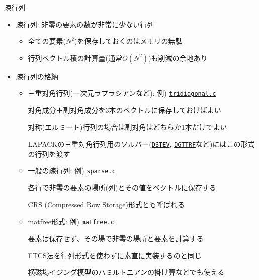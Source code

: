 \begin{frame}[t,fragile]{疎行列}
  \begin{itemize}
    \setlength{\itemsep}{1em}
  \item 疎行列: 非零の要素の数が非常に少ない行列
    \begin{itemize}
    \item 全ての要素($N^2$)を保存しておくのはメモリの無駄
    \item 行列ベクトル積の計算量(通常$O(N^2)$)も削減の余地あり
    \end{itemize}
  \item 疎行列の格納
    \begin{itemize}
    \item 三重対角行列(一次元ラプラシアンなど): 例) \href{https://github.com/todo-group/computer-experiments/blob/master/exercise/eigenvalue_problem/tridiagonal.c}{\texttt{tridiagonal.c}}

      対角成分＋副対角成分を3本のベクトルに保存しておけばよい

      対称(エルミート)行列の場合は副対角はどちらか1本だけでよい

      LAPACKの三重対角行列用のソルバー(\href{https://netlib.org/lapack/explore-html/dc/dd2/group__double_o_t_h_e_reigen_gaaa6df51cfd92c4ab08d41a54bf05c3ab.html}{\texttt{DSTEV}}, \href{https://netlib.org/lapack/explore-html/d1/d40/group__double_g_tcomputational_ga8ca64e542924cec56cbe9837b77d25b7.html}{\texttt{DGTTRF}}など)にはこの形式の行列を渡す

    \item 一般の疎行列: 例) \href{https://github.com/todo-group/computer-experiments/blob/master/exercise/eigenvalue_problem/sparse.c}{\texttt{sparse.c}}

      各行で非零の要素の場所(列)とその値をベクトルに保存する

      CRS (Compressed Row Storage)形式とも呼ばれる

    \item matfree形式: 例) \href{https://github.com/todo-group/computer-experiments/blob/master/exercise/eigenvalue_problem/matfree.c}{\texttt{matfree.c}}

      要素は保存せず、その場で非零の場所と要素を計算する

      FTCS法を行列形式を使わずに素直に実装するのと同じ

      横磁場イジング模型のハミルトニアンの掛け算などでも使える
    \end{itemize}
  \end{itemize}
\end{frame}
